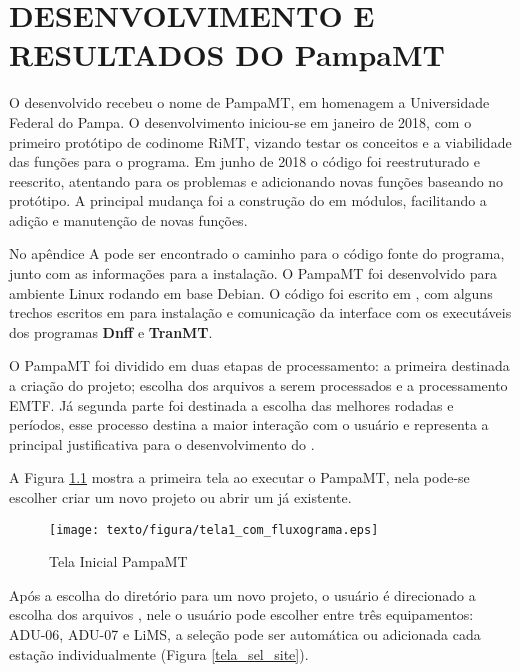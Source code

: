 \chapter{DESENVOLVIMENTO E RESULTADOS DO PampaMT}

    O  desenvolvido recebeu o nome de PampaMT, em homenagem a Universidade Federal do Pampa. O desenvolvimento iniciou-se em janeiro de 2018, com o primeiro protótipo de codinome RiMT, vizando testar os conceitos e a viabilidade das funções para o programa. Em junho de 2018 o código foi reestruturado e reescrito, atentando para os problemas e adicionando novas funções baseando no protótipo. A principal mudança foi a construção do  em módulos, facilitando a adição e manutenção de novas funções.
    
    No apêndice A pode ser encontrado o caminho para o código fonte do programa, junto com as informações para a instalação. O PampaMT foi desenvolvido para ambiente Linux rodando em base Debian. O código foi escrito em \Python, com alguns trechos escritos em \Shell{} para instalação e comunicação da interface com os executáveis dos programas \textbf{Dnff} e \textbf{TranMT}.
    
    O PampaMT foi dividido em duas etapas de processamento: a primeira destinada a criação do projeto; escolha dos arquivos a serem processados e a processamento EMTF. Já segunda parte foi destinada a escolha das melhores rodadas e períodos, esse processo destina a maior interação com o usuário e representa a principal justificativa para o desenvolvimento do . 
    
    A Figura \ref{tela_inicial} mostra a primeira tela ao executar o PampaMT, nela pode-se escolher criar um novo projeto ou abrir um já existente.
    
    \begin{figure}[H]
        \caption{Tela Inicial PampaMT}
            \begin{center}
                \texttt{[image: texto/figura/tela1\_com\_fluxograma.eps]}
            \end{center}
        \label{tela_inicial}
    \end{figure}
    
     Após a escolha do diretório para um novo projeto, o usuário é direcionado a escolha dos arquivos , nele o usuário pode escolher entre três equipamentos: ADU-06, ADU-07 e LiMS, a seleção pode ser automática ou adicionada cada estação individualmente (Figura \ref{tela_sel_site}). 
    
